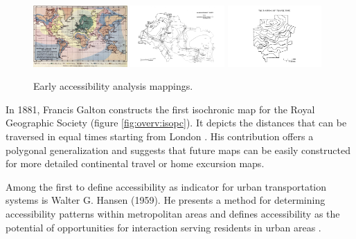     \begin{figure}[t]
      {\includegraphics[width=0.32\textwidth]{./img/overv-isopc.jpg}}
      \hfill
      {\includegraphics[width=0.32\textwidth]{./img/overv-nodac.png}}
      \hfill
      {\includegraphics[width=0.32\textwidth]{./img/overv-maptt.png}}
      \caption{Early accessibility analysis mappings.}
      \label{fig:overv:1}
    \end{figure}

    In 1881, Francis Galton constructs the first isochronic map for the Royal
    Geographic Society (figure \ref{fig:overv:isopc}). It depicts the
    distances that can be traversed in equal times starting from London
    \cite{galton1881construction}. His contribution offers a polygonal
    generalization and suggests that future maps can be easily constructed for
    more detailed continental travel or home excursion maps.\par

    Among the first to define accessibility as indicator for urban
    transportation systems is Walter G. Hansen (1959). He presents a method for
    determining accessibility patterns within metropolitan areas and defines
    accessibility as the potential of opportunities for interaction serving
    residents in urban areas \cite{hansen1959accessibility}.\par

